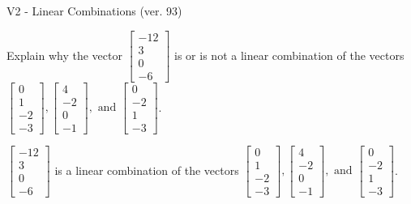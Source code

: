 \begin{exercise}
  \begin{exerciseTitle}V2 - Linear Combinations (ver. 93)\end{exerciseTitle}
  \begin{exerciseStatement}
    Explain why the vector \(\left[\begin{array}{c}
-12 \\
3 \\
0 \\
-6
\end{array}\right]\)  is or is not a linear 
	combination of the vectors \(\left[\begin{array}{c}
0 \\
1 \\
-2 \\
-3
\end{array}\right] , \left[\begin{array}{c}
4 \\
-2 \\
0 \\
-1
\end{array}\right] , \text{ and } \left[\begin{array}{c}
0 \\
-2 \\
1 \\
-3
\end{array}\right]\).
	


  \end{exerciseStatement}
  \begin{exerciseAnswer}
   \(\left[\begin{array}{c}
-12 \\
3 \\
0 \\
-6
\end{array}\right]\) 
  	 is  
	a linear combination of the vectors \(\left[\begin{array}{c}
0 \\
1 \\
-2 \\
-3
\end{array}\right] , \left[\begin{array}{c}
4 \\
-2 \\
0 \\
-1
\end{array}\right] , \text{ and } \left[\begin{array}{c}
0 \\
-2 \\
1 \\
-3
\end{array}\right]\).

	
  


  \end{exerciseAnswer}
\end{exercise}